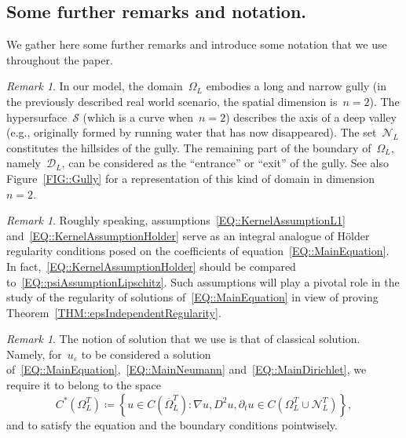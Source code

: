 \documentclass[12pt,a4paper]{amsart}
\numberwithin{equation}{section}
\theoremstyle{definition}
\theoremstyle{remark}
\newtheorem{remark}[theorem]{Remark}
\newcommand{\eps}{\varepsilon}
\begin{document}
\subsection{Some further remarks and notation.}

We gather here some further remarks and introduce some notation that we use throughout the paper.

\begin{remark}
    In our model, the domain~$\Omega_L$ embodies a long and narrow gully (in the previously described real world scenario, the spatial dimension is~$n = 2$). The hypersurface~$\mathcal{S}$ (which is a curve when~$n=2$) describes the axis of a deep valley (e.g., originally formed by running water that has now disappeared). The set~$\mathcal{N}_L$ constitutes the hillsides of the gully. The remaining part of the boundary of~$\Omega_L$, namely~$\mathcal{D}_L$, can be considered as the ``entrance'' or ``exit'' of the gully. See also Figure~\ref{FIG::Gully} for a representation of this kind of domain in dimension~$n=2$.
\end{remark}

\begin{remark}
    Roughly speaking, assumptions~\eqref{EQ::KernelAssumptionL1} and~\eqref{EQ::KernelAssumptionHolder} serve as an integral analogue of Hölder regularity conditions posed on the coefficients of equation~\eqref{EQ::MainEquation}. In fact,~\eqref{EQ::KernelAssumptionHolder} should be compared to~\eqref{EQ::psiAssumptionLipschitz}. Such assumptions will play a pivotal role in the study of the regularity of solutions of~\eqref{EQ::MainEquation} in view of proving Theorem~\ref{THM::epsIndependentRegularity}.
\end{remark}

\begin{remark}
    The notion of solution that we use is that of classical solution. Namely, for~$u_\eps$ to be considered a solution of~\eqref{EQ::MainEquation},~\eqref{EQ::MainNeumann} and~\eqref{EQ::MainDirichlet}, we require it to belong to the space
    \begin{equation}\label{EQ::CstarDefinition}
        C^\ast\left(\Omega_L^T\right) \coloneq \left\{u \in C\left(\overline{\Omega}_L^T\right) \colon \nabla u, D^2 u, \partial_t u \in C\left(\Omega_L^T \cup \mathcal{N}_L^T\right)\right\},
    \end{equation}
    and to satisfy the equation and the boundary conditions pointwisely.
\end{remark}
\end{document}
